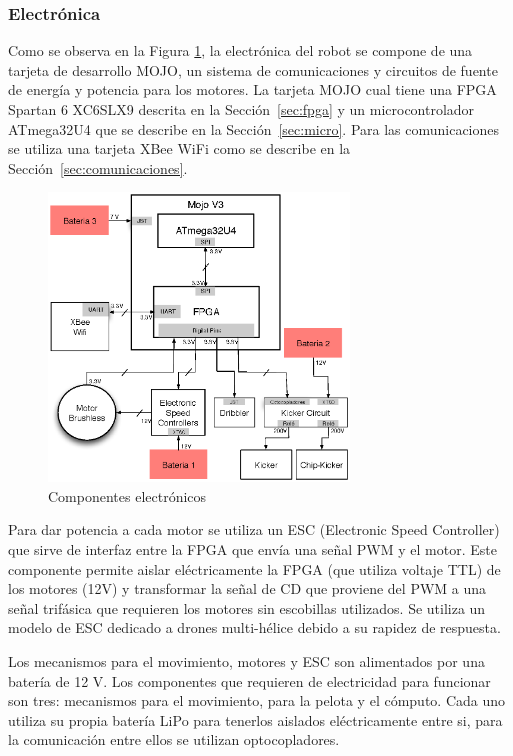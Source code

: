 \documentclass[twocolumn,10pt]{amrob}
\begin{document}
\subsubsection*{Electrónica} Como se observa en la Figura \ref{fig:electGral}, la electrónica del robot se compone de una tarjeta de desarrollo MOJO, un sistema de comunicaciones y circuitos de fuente de energía y potencia para los motores. La tarjeta MOJO cual tiene una FPGA Spartan 6 XC6SLX9 descrita en la Sección~\ref{sec:fpga} y un microcontrolador ATmega32U4 que se describe en la Sección~\ref{sec:micro}. Para las comunicaciones se utiliza una tarjeta XBee WiFi como se describe en la Sección~\ref{sec:comunicaciones}. 
\begin{figure}
  \centering
    \includegraphics[width=8cm]{diagElectronica.eps}
  \caption{Componentes electrónicos}
  \label{fig:electGral}
\end{figure}


Para dar potencia a cada motor se utiliza un ESC (Electronic Speed Controller) que sirve de interfaz entre la FPGA que envía una señal PWM y el motor. Este componente permite aislar eléctricamente la FPGA (que utiliza voltaje TTL) de los motores (12V) y transformar la señal de CD que proviene del PWM a una señal trifásica que requieren los motores sin escobillas utilizados. Se utiliza un modelo de ESC dedicado a drones multi-hélice debido a su rapidez de respuesta. 

Los mecanismos para el movimiento, motores y ESC son alimentados por una batería de 12 V. Los componentes que requieren de electricidad para funcionar son tres: mecanismos para el movimiento, para la pelota y el cómputo. Cada uno utiliza su propia batería LiPo para tenerlos aislados eléctricamente entre si, para la comunicación entre ellos se utilizan optocopladores. 
\end{document}
